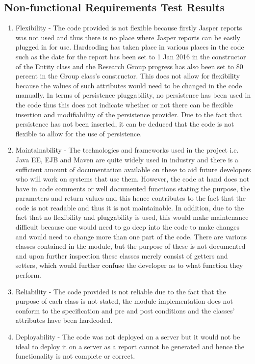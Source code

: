 \subsection{Non-functional Requirements Test Results}
\begin{enumerate} 
\item Flexibility - The code provided is not flexible because firstly Jasper reports was not used and thus there is no place where Jasper reports can be easily plugged in for use. Hardcoding has taken place in various places in the code such as the date for the report has been set to 1 Jan 2016 in the constructor of the Entity class and the Research Group progress has also been set to 80 percent in the Group class's constructor. This does not allow for flexibility because the values of such attributes would need to be changed in the code manually. In terms of persistence pluggability, no persistence has been used in the code thus this does not indicate whether or not there can be flexible insertion and modifiability of the persistence provider. Due to the fact that persistence has not been inserted, it can be deduced that the code is not flexible to allow for the use of persistence.
\item Maintainability - The technologies and frameworks used in the project i.e. Java EE, EJB and Maven are quite widely used in industry and there is a sufficient amount of documentation available on these to aid future developers who will work on systems that use them. However, the code at hand does not have in code comments or well documented functions stating the purpose, the parameters and return values and this hence contributes to the fact that the code is not readable and thus it is not maintainable. In addition, due to the fact that no flexibility and pluggability is used, this would make maintenance difficult because one would need to go deep into the code to make changes and would need to change more than one part of the code. There are various classes contained in the module, but the purpose of these is not documented and upon further inspection these classes merely consist of getters and setters, which would further confuse the developer as to what function they perform. 
\item Reliability - The code provided is not reliable due to the fact that the purpose of each class is not stated, the module implementation does not conform to the specification and pre and post conditions and the classes' attributes have been hardcoded.
\item Deployability - The code was not deployed on a server but it would not be ideal to deploy it on a server as a report cannot be generated and hence the functionality is not complete or correct. 
\end{enumerate}
